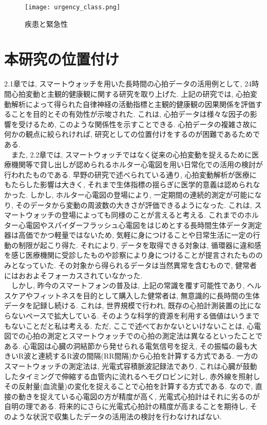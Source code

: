\documentclass[report, 11pt, a4paper]{jsbook}
\begin{document}
\begin{figure}[H]
\centering
\texttt{[image: urgency\_class.png]}
\caption{疾患と緊急性}
\label{fig:goolge_trends}
\end{figure}


\section{本研究の位置付け}
2.1章では, スマートウォッチを用いた長時間の心拍データの活用例として, 24時間心拍変動と主観的健康観に関する研究を取り上げた. 上記の研究では, 心拍変動解析によって得られた自律神経の活動指標と主観的健康観の因果関係を評価することを目的とその有効性が示唆された. これは, 心拍データは様々な因子の影響を受けるため, このような関係性を示すことできる. 心拍データの複雑さ故に何かの観点に絞られければ, 研究としての位置付けをするのが困難であるためである.\\
~~また, 2.2章では, スマートウォッチではなく従来の心拍変動を捉えるために医療機関等で貸し出しが認められるホルター心電図を用い日常化での活用の検討が行われたものである. 早野の研究で述べられている通り, 心拍変動解析が医療にもたらした影響は大きく, それまで生体指標の揺らぎに医学的意義は認められなかった. しかし, ホルター心電図の登場により, 一定期間の連続的測定が可能になり, そのデータから変動の周波数の大きさが評価できるようになった. これは, スマートウォッチの登場によっても同様のことが言えると考える. これまでのホルター心電図やスパイダーフラッシュ心電図をはじめとする長時間生体データ測定器は高価でかつ軽量ではないため, 気軽に身につけることや日常生活に一定の行動の制限が起こり得た. それにより, データを取得できる対象は, 循環器に違和感を感じ医療機関に受診したものや診察により身につけることが提言されたもののみとなっていた. その対象から得られるデータは当然異常を含むもので, 健常者にはおおよそフォーカスされていなかった. \\
~~しかし, 昨今のスマートフォンの普及は, 上記の常識を覆す可能性であり, ヘルスケアやフィットネスを目的として購入した健常者は, 無意識的に長時間の生体データを記録し続ける. これは, 世界規模で行われ, 既存の心拍計測装置の比にならないペースで拡大している. そのような科学的資源を利用する価値はいうまでもないことだと私は考える. ただ, ここで述べておかないといけないことは, 心電図での心拍の測定とスマートウォッチでの心拍の測定法は異なるといったことである. 心電図は心臓の洞結節から発せられる電気信号を捉え, その振幅の最も大きいR波と連続するR波の間隔(RR間隔)から心拍を計算する方式である. 一方のスマートウォッチの測定法は, 光電式容積脈波記録法であり, これは心臓が鼓動したタイミングで伸縮する血管内に流れるヘモグロビンに対し, 赤外線を照射しその反射量(血流量)の変化を捉えることで心拍を計算する方式である. なので, 直接の動きを捉えている心電図の方が精度が高く, 光電式心拍計はそれに劣るのが自明の理である. 将来的にさらに光電式心拍計の精度が高まることを期待し, そのような状況で収集したデータの活用法の検討を行わなければない.\\
\end{document}

